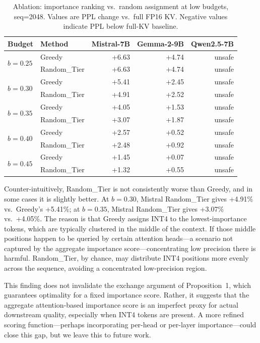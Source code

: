 \documentclass[11pt]{article}
\newcommand{\budget}{b}
\newcommand{\pct}{\%}
\theoremstyle{plain}
\theoremstyle{definition}
\begin{document}
\begin{table}[t]
\centering
\caption{Ablation: importance ranking vs.\ random assignment at low budgets, seq=2048.  Values are PPL change vs.\ full FP16 KV.  Negative values indicate PPL below full-KV baseline.}
\label{tab:ablation-ranking}
\small
\begin{tabular}{llrrr}
\toprule
Budget & Method & Mistral-7B & Gemma-2-9B & Qwen2.5-7B \\
\midrule
\multirow{2}{*}{$\budget=0.25$}
  & Greedy & +6.63 & +4.74 & unsafe \\
  & Random\_Tier & +6.63 & +4.74 & unsafe \\
\midrule
\multirow{2}{*}{$\budget=0.30$}
  & Greedy & +5.41 & +2.45 & unsafe \\
  & Random\_Tier & +4.91 & +2.52 & unsafe \\
\midrule
\multirow{2}{*}{$\budget=0.35$}
  & Greedy & +4.05 & +1.53 & unsafe \\
  & Random\_Tier & +3.07 & +1.87 & unsafe \\
\midrule
\multirow{2}{*}{$\budget=0.40$}
  & Greedy & +2.57 & +0.52 & unsafe \\
  & Random\_Tier & +2.48 & +0.92 & unsafe \\
\midrule
\multirow{2}{*}{$\budget=0.45$}
  & Greedy & +1.45 & +0.07 & unsafe \\
  & Random\_Tier & +1.32 & +0.55 & unsafe \\
\bottomrule
\end{tabular}
\end{table}

Counter-intuitively, Random\_Tier is not consistently worse than Greedy, and in some cases it is slightly better.  At $\budget=0.30$, Mistral Random\_Tier gives +4.91\pct{} vs.\ Greedy's +5.41\pct{}; at $\budget=0.35$, Mistral Random\_Tier gives +3.07\pct{} vs.\ +4.05\pct{}.  The reason is that Greedy assigns INT4 to the lowest-importance tokens, which are typically clustered in the middle of the context.  If those middle positions happen to be queried by certain attention heads---a scenario not captured by the aggregate importance score---concentrating low precision there is harmful.  Random\_Tier, by chance, may distribute INT4 positions more evenly across the sequence, avoiding a concentrated low-precision region.

This finding does not invalidate the exchange argument of Proposition~1, which guarantees optimality for a fixed importance score.  Rather, it suggests that the aggregate attention-based importance score is an imperfect proxy for actual downstream quality, especially when INT4 tokens are present.  A more refined scoring function---perhaps incorporating per-head or per-layer importance---could close this gap, but we leave this to future work.
\end{document}
